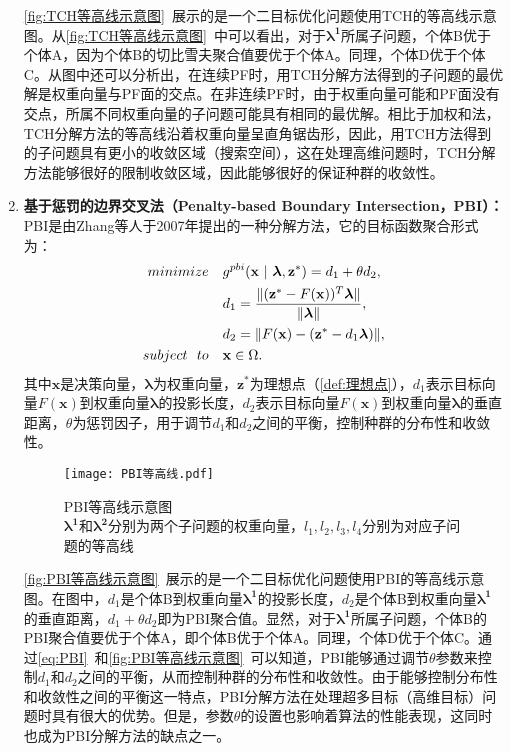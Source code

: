 \begin{enumerate}
\begin{figure}[htb]
        \label{fig:TCH等高线示意图}
    \end{figure}
    \par
    \autoref{fig:TCH等高线示意图}~展示的是一个二目标优化问题使用TCH的等高线示意图。从\autoref{fig:TCH等高线示意图}~中可以看出，对于$\boldsymbol{\lambda^1}$所属子问题，个体B优于个体A，因为个体B的切比雪夫聚合值要优于个体A。同理，个体D优于个体C。从图中还可以分析出，在连续PF时，用TCH分解方法得到的子问题的最优解是权重向量与PF面的交点。在非连续PF时，由于权重向量可能和PF面没有交点，所属不同权重向量的子问题可能具有相同的最优解。相比于加权和法，TCH分解方法的等高线沿着权重向量呈直角锯齿形，因此，用TCH方法得到的子问题具有更小的收敛区域（搜索空间），这在处理高维问题时，TCH分解方法能够很好的限制收敛区域，因此能够很好的保证种群的收敛性。
    \item \textbf{基于惩罚的边界交叉法（Penalty-based Boundary Intersection，PBI）：}PBI是由Zhang等人于2007年提出的一种分解方法\cite{zhang2007moea}，它的目标函数聚合形式为：
    \begin{align}
        \label{eq:PBI}
        minimize \quad & g^{pbi}(\mathbf{x} \ | \ \boldsymbol{\lambda},\mathbf{z}^*) = d_1 + \theta d_2, \\
        & d_1 = \frac{\| (\mathbf{z}^* - F(\mathbf{x}))^T \boldsymbol{\lambda} \Vert }{ \|  \boldsymbol{\lambda} \Vert }, \notag\\
        & d_2 = \| F(\mathbf{x}) - (\mathbf{z}^* - d_1 \boldsymbol{\lambda}) \Vert, \notag \\
        subject \ \ to \quad & \mathbf{x} \in \Omega. \notag
    \end{align}
    其中$\mathbf{x}$是决策向量，$\boldsymbol{\lambda}$为权重向量，$\mathbf{z}^*$为理想点（\autoref{def:理想点}），$d_1$表示目标向量$F(\mathbf{x})$到权重向量$\boldsymbol{\lambda}$的投影长度，$d_2$表示目标向量$F(\mathbf{x})$到权重向量$\boldsymbol{\lambda}$的垂直距离，$\theta$为惩罚因子，用于调节$d_1$和$d_2$之间的平衡，控制种群的分布性和收敛性。
    \par
    \begin{figure}[htb]
        \texttt{[image: PBI等高线.pdf]}
        \caption[PBI等高线示意图]{PBI等高线示意图 \\ $\boldsymbol{\lambda^1}$和$\boldsymbol{\lambda^2}$分别为两个子问题的权重向量，$l_1, l_2, l_3, l_4$分别为对应子问题的等高线}
        \label{fig:PBI等高线示意图}
    \end{figure}
    \par
    \autoref{fig:PBI等高线示意图}~展示的是一个二目标优化问题使用PBI的等高线示意图。在图中，$d_1$是个体B到权重向量$\boldsymbol{\lambda^1}$的投影长度，$d_2$是个体B到权重向量$\boldsymbol{\lambda^1}$的垂直距离，$d_1+\theta d_2$即为PBI聚合值。显然，对于$\boldsymbol{\lambda^1}$所属子问题，个体B的PBI聚合值要优于个体A，即个体B优于个体A。同理，个体D优于个体C。通过\autoref{eq:PBI}~和\autoref{fig:PBI等高线示意图}~可以知道，PBI能够通过调节$\theta$参数来控制$d_1$和$d_2$之间的平衡，从而控制种群的分布性和收敛性。由于能够控制分布性和收敛性之间的平衡这一特点，PBI分解方法在处理超多目标（高维目标）问题时具有很大的优势。但是，参数$\theta$的设置也影响着算法的性能表现，这同时也成为PBI分解方法的缺点之一。
\end{enumerate}
